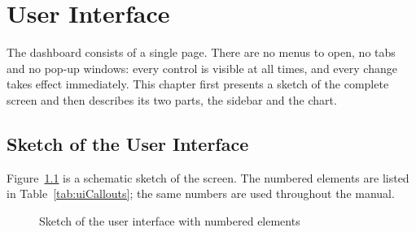 %
%
%


\chapter{User Interface}
\label{chap:ui}

The dashboard consists of a single page. There are no menus to open, no tabs and no pop-up windows: every control is visible at all times, and every change takes effect immediately. This chapter first presents a sketch of the complete screen and then describes its two parts, the sidebar and the chart.

\section{Sketch of the User Interface}
\label{sec:uiSketch}

Figure~\ref{fig:uiWireframe} is a schematic sketch of the screen. The numbered elements are listed in Table~\ref{tab:uiCallouts}; the same numbers are used throughout the manual.

\begin{figure}[H]
  \centering
  \resizebox{\linewidth}{!}{}
  \caption{Sketch of the user interface with numbered elements}
  \label{fig:uiWireframe}
\end{figure}

